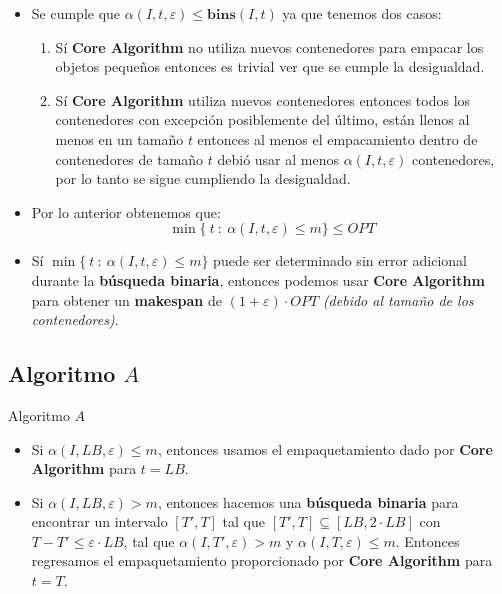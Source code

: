 \begin{frame}{\subsectiontitle}
    \begin{itemize}
        \item Se cumple que \(\alpha\left(I, t, \varepsilon\right) \leq \mathbf{bins}\left(I, t\right)\) ya que tenemos dos casos:
        \begin{enumerate}
            \item Sí \textbf{Core Algorithm} no utiliza nuevos contenedores para empacar los objetos pequeños entonces es trivial ver que se cumple la desigualdad.
            \item Sí \textbf{Core Algorithm} utiliza nuevos contenedores entonces todos los contenedores con excepción posiblemente del último, están llenos al menos en un tamaño \(t\) entonces al menos el empacamiento dentro de contenedores de tamaño \(t\) debió usar al menos \(\alpha\left(I, t, \varepsilon\right)\) contenedores, por lo tanto se sigue cumpliendo la desigualdad.
        \end{enumerate}
        \item Por lo anterior obtenemos que:
        \[
            \min \{ \ t \ : \ \alpha\left(I, t, \varepsilon\right) \leq m\} \leq OPT
        \]
    \end{itemize}
\end{frame}

\begin{frame}{\subsectiontitle}
    \begin{itemize}
        \item Sí \(\min \{ \ t \ : \ \alpha\left(I, t, \varepsilon\right) \leq m\}\) puede ser determinado sin error adicional durante la \textbf{búsqueda binaria}, entonces podemos usar \textbf{Core Algorithm} para obtener un \textbf{makespan} de \((1 + \varepsilon) \cdot OPT\) \textit{(debido al tamaño de los contenedores)}.
    \end{itemize}
\end{frame}

\renewcommand{\subsectiontitle}{Algoritmo $A$}
\subsection{\subsectiontitle}

\begin{frame}{\subsectiontitle}
\begin{itemize}
    \item Si \(\alpha\left(I, LB, \varepsilon\right) \leq m\), entonces usamos el empaquetamiento dado por 
    \textbf{Core Algorithm} para \(t = LB\).
    \item Si \(\alpha\left(I, LB, \varepsilon\right) > m\), entonces hacemos una \textbf{búsqueda binaria} para encontrar 
    un intervalo \([T', T]\) tal que \([T', T] \subseteq [LB, 2\cdot LB]\) con \(T - T' \leq \varepsilon \cdot LB\), 
    tal que \(\alpha\left(I, T', \varepsilon\right) > m\) y \(\alpha\left(I, T, \varepsilon\right) \leq m\). Entonces
    regresamos el empaquetamiento proporcionado por \textbf{Core Algorithm} para \(t = T\).
\end{itemize}
\end{frame}

